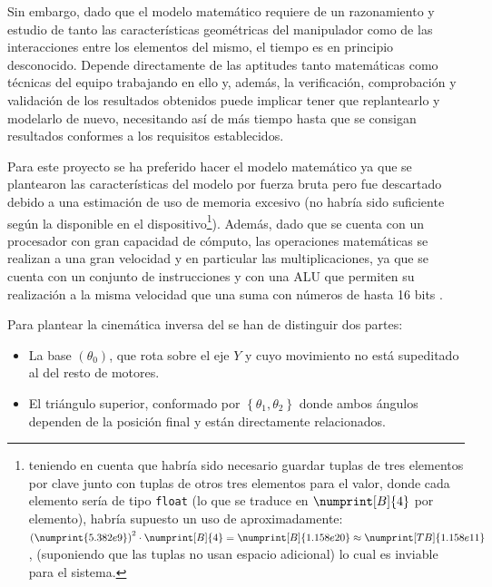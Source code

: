 \begin{itemize}
          Sin embargo, dado que el modelo matemático requiere de un razonamiento y estudio
          de tanto las características geométricas del manipulador como de las interacciones
          entre los elementos del mismo, el tiempo es en principio desconocido. Depende
          directamente de las aptitudes tanto matemáticas como técnicas del equipo trabajando
          en ello y, además, la verificación, comprobación y validación de los resultados
          obtenidos puede implicar tener que replantearlo y modelarlo de nuevo, necesitando
          así de más tiempo hasta que se consigan resultados conformes a los requisitos
          establecidos.
\end{itemize}

Para este proyecto se ha preferido hacer el modelo matemático ya que se plantearon las
características del modelo por fuerza bruta pero fue descartado debido a una estimación de
uso de memoria excesivo (no habría sido suficiente según la disponible en el dispositivo\footnote{teniendo en cuenta
    que habría sido necesario guardar tuplas de tres elementos por clave junto con tuplas de
    otros tres elementos para el valor, donde cada elemento sería de tipo \texttt{float}
    (lo que se traduce en $\numprint[B]{4}$ por elemento), habría supuesto un uso de
    aproximadamente: $\left(\numprint{5.382e9}\right)^2 \cdot \numprint[B]{4} = \numprint[B]{1.158e20} \approx \numprint[TB]{1.158e11} $,
    (suponiendo que las tuplas no usan espacio adicional) lo cual es inviable para el sistema.}).
Además, dado que se cuenta con un procesador con gran capacidad de cómputo, las operaciones
matemáticas se realizan a una gran velocidad y en particular las multiplicaciones, ya que
se cuenta con un conjunto de instrucciones y con una \ac{ALU} que permiten su realización
a la misma velocidad que una suma con números de hasta 16 bits \cite{microchipDsPIC33EPIC24EFRM2010}.

Para plantear la cinemática inversa del \pArm{} se han de distinguir dos partes:
\begin{itemize}
    \item La base $\left(\theta_0\right)$, que rota sobre el eje $Y$ y cuyo movimiento no está supeditado al
          del resto de motores.

    \item El triángulo superior, conformado por $\left\{\theta_1, \theta_2\right\}$ donde
          ambos ángulos dependen de la posición final y están directamente relacionados.
\end{itemize}


